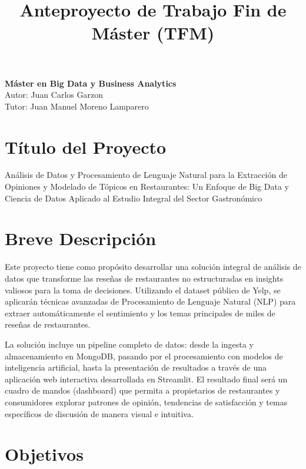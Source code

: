 \documentclass[12pt,a4paper]{article}
\title{\textbf{Anteproyecto de Trabajo Fin de Máster (TFM)}}
\author{}
\date{}
\begin{document}
\maketitle
\thispagestyle{empty}

\begin{center}
\textbf{Máster en Big Data y Business Analytics} \\
Autor: Juan Carlos Garzon \\
Tutor: Juan Manuel Moreno Lamparero
\end{center}

\vspace{1cm}

\section{Título del Proyecto}

Análisis de Datos y Procesamiento de Lenguaje Natural para la Extracción de Opiniones y Modelado de Tópicos en Restaurantes: Un Enfoque de Big Data y Ciencia de Datos Aplicado al Estudio Integral del Sector Gastronómico

\section{Breve Descripción}

Este proyecto tiene como propósito desarrollar una solución integral de análisis de datos que transforme las reseñas de restaurantes no estructuradas en insights valiosos para la toma de decisiones. Utilizando el dataset público de Yelp, se aplicarán técnicas avanzadas de Procesamiento de Lenguaje Natural (NLP) para extraer automáticamente el sentimiento y los temas principales de miles de reseñas de restaurantes.

La solución incluye un pipeline completo de datos: desde la ingesta y almacenamiento en MongoDB, pasando por el procesamiento con modelos de inteligencia artificial, hasta la presentación de resultados a través de una aplicación web interactiva desarrollada en Streamlit. El resultado final será un cuadro de mandos (dashboard) que permita a propietarios de restaurantes y consumidores explorar patrones de opinión, tendencias de satisfacción y temas específicos de discusión de manera visual e intuitiva.

\section{Objetivos}
\end{document}
